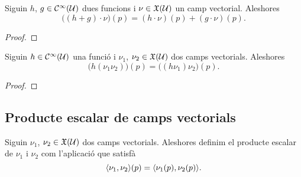 \documentclass[../../Main.tex]{subfiles}
\begin{document}
	\begin{proposition}
		\label{prop:el producte d'una funcio i un camp vectorial és distributiu per la suma de funcions}
		Siguin \(h\), \(g\in\mathcal{C}^{\infty}(\mathcal{U})\) dues funcions i \(\nu\in\mathfrak{X}(\mathcal{U})\) un camp vectorial. Aleshores
		\[
		    \big((h+g)\cdot\nu\big)(p)=(h\cdot\nu)(p)+(g\cdot\nu)(p).
		\]
		\begin{proof}
		\end{proof}
	\end{proposition}
	\begin{proposition}
		\label{prop:el producte d'una funció i un camp vectorial és associatiu pel producte de camps vectorials}
		Siguin \(h\in\mathcal{C}^{\infty}(\mathcal{U})\) una funció i \(\nu_{1}\), \(\nu_{2}\in\mathfrak{X}(\mathcal{U})\) dos camps vectorials. Aleshores
		\[
		    \big(h(\nu_{1}\nu_{2})\big)(p)=\big((h\nu_{1})\nu_{2}\big)(p).
		\]
		\begin{proof}
		\end{proof}
	\end{proposition}
	
	\subsection{Producte escalar de camps vectorials}
	\begin{definition}
		\label{def:producte escalar de camps vectorials}
		Siguin \(\nu_{1}\), \(\nu_{2}\in\mathfrak{X}(\mathcal{U})\) dos camps vectorials. Aleshores definim el producte escalar de \(\nu_{1}\) i \(\nu_{2}\) com l'aplicació que satisfà
		\[
		    \prodesc{\nu_{1}}{\nu_{2}}(p)=\prodesc{\nu_{1}(p)}{\nu_{2}(p)}.
		\]
	\end{definition}
\end{document}
